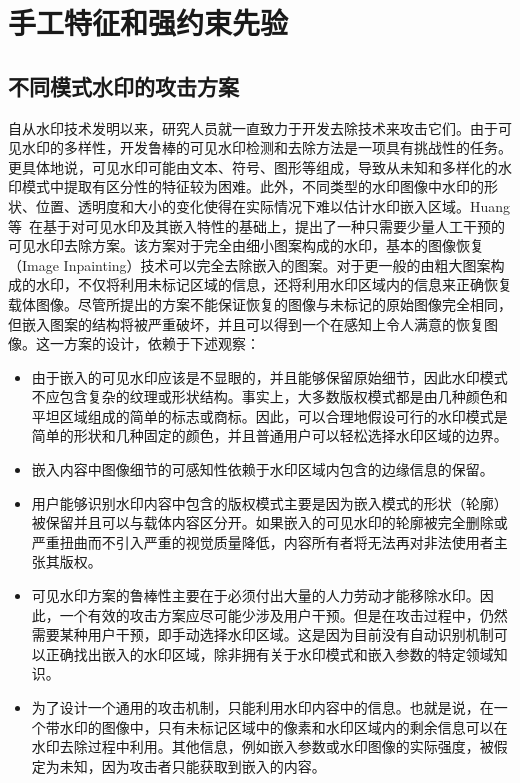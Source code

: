 \section{手工特征和强约束先验}
\label{sec:tradition}

\subsection{不同模式水印的攻击方案}

自从水印技术发明以来，研究人员就一直致力于开发去除技术来攻击它们。由于可见水印的多样性，开发鲁棒的可见水印检测和去除方法是一项具有挑战性的任务。更具体地说，可见水印可能由文本、符号、图形等组成，导致从未知和多样化的水印模式中提取有区分性的特征较为困难。此外，不同类型的水印图像中水印的形状、位置、透明度和大小的变化使得在实际情况下难以估计水印嵌入区域。Huang 等~\cite{huang2004attacking}在基于对可见水印及其嵌入特性的基础上，提出了一种只需要少量人工干预的可见水印去除方案。该方案对于完全由细小图案构成的水印，基本的图像恢复（Image Inpainting）技术可以完全去除嵌入的图案。对于更一般的由粗大图案构成的水印，不仅将利用未标记区域的信息，还将利用水印区域内的信息来正确恢复载体图像。尽管所提出的方案不能保证恢复的图像与未标记的原始图像完全相同，但嵌入图案的结构将被严重破坏，并且可以得到一个在感知上令人满意的恢复图像。这一方案的设计，依赖于下述观察：

\begin{itemize}
	\item 由于嵌入的可见水印应该是不显眼的，并且能够保留原始细节，因此水印模式不应包含复杂的纹理或形状结构。事实上，大多数版权模式都是由几种颜色和平坦区域组成的简单的标志或商标。因此，可以合理地假设可行的水印模式是简单的形状和几种固定的颜色，并且普通用户可以轻松选择水印区域的边界。
	\item 嵌入内容中图像细节的可感知性依赖于水印区域内包含的边缘信息的保留。
	\item 用户能够识别水印内容中包含的版权模式主要是因为嵌入模式的形状（轮廓）被保留并且可以与载体内容区分开。如果嵌入的可见水印的轮廓被完全删除或严重扭曲而不引入严重的视觉质量降低，内容所有者将无法再对非法使用者主张其版权。
	\item 可见水印方案的鲁棒性主要在于必须付出大量的人力劳动才能移除水印。因此，一个有效的攻击方案应尽可能少涉及用户干预。但是在攻击过程中，仍然需要某种用户干预，即手动选择水印区域。这是因为目前没有自动识别机制可以正确找出嵌入的水印区域，除非拥有关于水印模式和嵌入参数的特定领域知识。
	\item 为了设计一个通用的攻击机制，只能利用水印内容中的信息。也就是说，在一个带水印的图像中，只有未标记区域中的像素和水印区域内的剩余信息可以在水印去除过程中利用。其他信息，例如嵌入参数或水印图像的实际强度，被假定为未知，因为攻击者只能获取到嵌入的内容。
\end{itemize}

